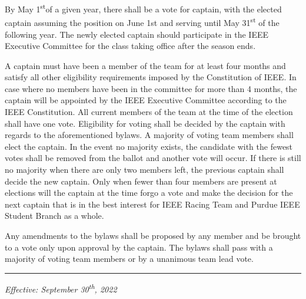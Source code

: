 \documentclass[12pt]{constitution}
\newcommand{\dateelectionsheld}{May 1\textsuperscript{st}} %
\begin{document}
\label{art:elect}

By \dateelectionsheld of a given year, there shall be a vote for captain, with the elected captain assuming the position on June 1st and serving until May 31\textsuperscript{st} of the following year. The newly elected captain should participate in the IEEE Executive Committee for the class taking office after the season ends.

A captain must have been a member of the team for at least four months and satisfy all other eligibility requirements imposed by the Constitution of IEEE. In case where no members have been in the committee for more than 4 months, the captain will be appointed by the IEEE Executive Committee according to the IEEE Constitution. All current members of the team at the time of the election shall have one vote. Eligibility for voting shall be decided by the captain with regards to the aforementioned bylaws. A majority of voting team members shall elect the captain. In the event no majority exists, the candidate with the fewest votes shall be removed from the ballot and another vote will occur. If there is still no majority when there are only two members left, the previous captain shall decide the new captain. Only when fewer than four members are present at elections will the captain at the time forgo a vote and make the decision for the next captain that is in the best interest for IEEE Racing Team and Purdue IEEE Student Branch as a whole. 

\label{art:bylaw}

Any amendments to the bylaws shall be proposed by any member and be brought to a vote only upon approval by the captain. The bylaws shall pass with a majority of voting team members or by a unanimous team lead vote.

\vspace{12pt}
\hrule

\textit{Effective: September 30\textsuperscript{th}, 2022}


\setcounter{tocdepth}{1}
\end{document}

